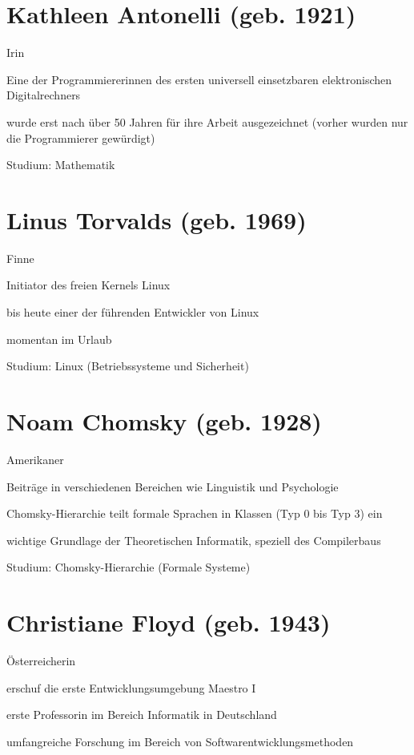 \documentclass[a4paper,12pt]{report}
\begin{document}
\section*{Kathleen Antonelli (geb. 1921)}
\begin{itemize*}
    \item Irin
    \item Eine der Programmiererinnen des ersten universell einsetzbaren elektronischen Digitalrechners
    \item wurde erst nach über 50 Jahren für ihre Arbeit ausgezeichnet (vorher wurden nur die Programmierer gewürdigt)
    \item Studium: Mathematik
\end{itemize*}

\section*{Linus Torvalds (geb. 1969)}
\begin{itemize*}
    \item Finne
    \item Initiator des freien Kernels Linux
    \item bis heute einer der führenden Entwickler von Linux
    \item momentan im Urlaub
    \item Studium: Linux (Betriebssysteme und Sicherheit)
\end{itemize*}

\section*{Noam Chomsky (geb. 1928)}
\begin{itemize*}
    \item Amerikaner
    \item Beiträge in verschiedenen Bereichen wie Linguistik und Psychologie
    \item Chomsky-Hierarchie teilt formale Sprachen in Klassen (Typ 0 bis Typ 3) ein
    \item wichtige Grundlage der Theoretischen Informatik, speziell des Compilerbaus
    \item Studium: Chomsky-Hierarchie (Formale Systeme)
\end{itemize*}

\newpage

\section*{Christiane Floyd (geb. 1943)}
\begin{itemize*}
    \item Österreicherin
    \item erschuf die erste Entwicklungsumgebung Maestro I
    \item erste Professorin im Bereich Informatik in Deutschland
    \item umfangreiche Forschung im Bereich von Softwarentwicklungsmethoden
\end{itemize*}
\end{document}
